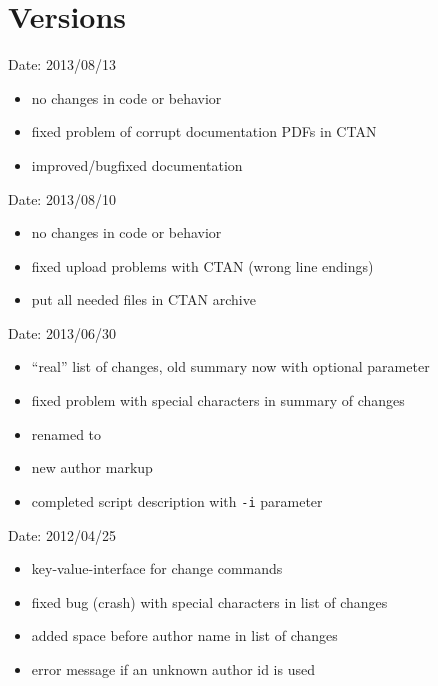 \section{Versions}
\label{sec:versions}


Date: 2013/08/13
\begin{itemize}
	\item no changes in code or behavior
	\item fixed problem of corrupt documentation PDFs in CTAN
	\item improved/bugfixed documentation
\end{itemize}


Date: 2013/08/10
\begin{itemize}
	\item no changes in code or behavior
	\item fixed upload problems with CTAN (wrong line endings)
	\item put all needed files in CTAN archive
\end{itemize}


Date: 2013/06/30
\begin{itemize}
	\item ``real'' list of changes, old summary now with optional parameter 
	\item fixed problem with special characters in summary of changes
	\item renamed  to 
	\item new author markup 
	\item completed script description with \texttt{-i} parameter
\end{itemize}


Date: 2012/04/25
\begin{itemize}
	\item key-value-interface for change commands
	\item fixed bug (crash) with special characters in list of changes
	\item added space before author name in list of changes
	\item error message if an unknown author id is used
\end{itemize}


